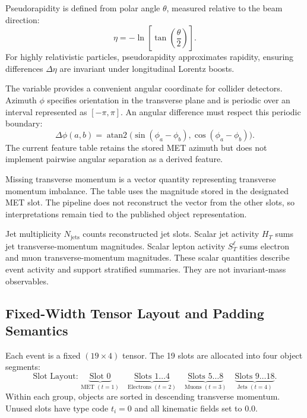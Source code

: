 \documentclass[11pt,a4paper]{article}
\newcommand{\HT}{H_{T}}
\newcommand{\STlep}{S_{T}^{\ell}}
\newcommand{\njet}{N_{\mathrm{jets}}}
\begin{document}
Pseudorapidity is defined from polar angle \(\theta\), measured relative to the beam direction:
\begin{equation}\eta=-\ln\left[\tan\left(\frac{\theta}{2}\right)\right].\label{eq:eta}\end{equation}
For highly relativistic particles, pseudorapidity approximates rapidity, ensuring differences \(\Delta\eta\) are invariant under longitudinal Lorentz boosts.

The variable provides a convenient angular coordinate for collider detectors. Azimuth \(\phi\) specifies orientation in the transverse plane and is periodic over an interval represented as \([-\pi,\pi]\). An angular difference must respect this periodic boundary:
\begin{equation}\Delta\phi(a,b)=\operatorname{atan2}\bigl(\sin(\phi_a-\phi_b),\cos(\phi_a-\phi_b)\bigr).\label{eq:dphi}\end{equation}
The current feature table retains the stored MET azimuth but does not implement pairwise angular separation as a derived feature.

Missing transverse momentum is a vector quantity representing transverse momentum imbalance. The table uses the magnitude stored in the designated MET slot. The pipeline does not reconstruct the vector from the other slots, so interpretations remain tied to the published object representation.

Jet multiplicity \(\njet\) counts reconstructed jet slots. Scalar jet activity \(\HT\) sums jet transverse-momentum magnitudes. Scalar lepton activity \(\STlep\) sums electron and muon transverse-momentum magnitudes. These scalar quantities describe event activity and support stratified summaries. They are not invariant-mass observables.

\subsection{Fixed-Width Tensor Layout and Padding Semantics}

Each event is a fixed $(19 \times 4)$ tensor. The 19 slots are allocated into four object segments:
\begin{equation}
    \text{Slot Layout: } \underbrace{\text{Slot } 0}_{\text{MET } (t=1)} \quad \underbrace{\text{Slots } 1\dots 4}_{\text{Electrons } (t=2)} \quad \underbrace{\text{Slots } 5\dots 8}_{\text{Muons } (t=3)} \quad \underbrace{\text{Slots } 9\dots 18}_{\text{Jets } (t=4)}.
\end{equation}
Within each group, objects are sorted in descending transverse momentum. Unused slots have type code $t_i = 0$ and all kinematic fields set to $0.0$.
\end{document}
